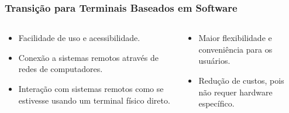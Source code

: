 \documentclass{beamer}
\begin{document}
\begin{frame}
	\frametitle{Transição para Terminais Baseados em Software}

	\begin{columns}
		\begin{column}{0.6\textwidth}

			\begin{itemize}
				\item Facilidade de uso e acessibilidade.
				\item Conexão a sistemas remotos através de redes de computadores.
				\item Interação com sistemas remotos como se estivesse usando um terminal físico direto.

			\end{itemize}
		\end{column}

		\begin{column}{0.4\textwidth}
			\begin{itemize}
				\item Maior flexibilidade e conveniência para os usuários.
				\item Redução de custos, pois não requer hardware específico.
			\end{itemize}
		\end{column}
	\end{columns}
\end{frame}
\end{document}
